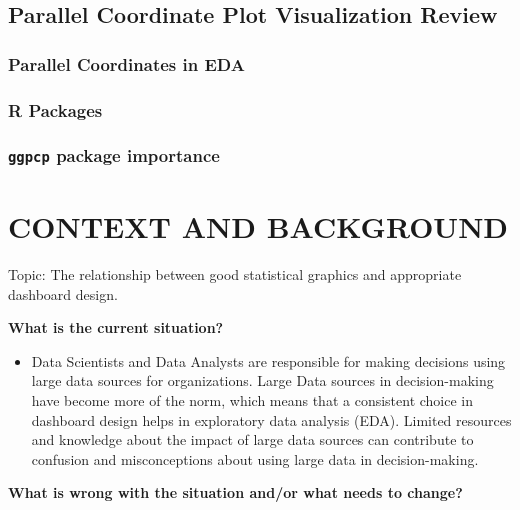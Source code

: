 \documentclass[print]{nuthesis}
\providecommand{\tightlist}{%
  \setlength{\itemsep}{0pt}\setlength{\parskip}{0pt}}
\begin{document}
\hypertarget{parallel-coordinate-plot-visualization-review}{%
\section{Parallel Coordinate Plot Visualization Review}\label{parallel-coordinate-plot-visualization-review}}

\hypertarget{parallel-coordinates-in-eda}{%
\subsection{Parallel Coordinates in EDA}\label{parallel-coordinates-in-eda}}

\hypertarget{r-packages}{%
\subsection{R Packages}\label{r-packages}}

\hypertarget{ggpcp-package-importance}{%
\subsection{\texorpdfstring{\texttt{ggpcp} package importance}{ggpcp package importance}}\label{ggpcp-package-importance}}

\hypertarget{context-and-background}{%
\chapter{CONTEXT AND BACKGROUND}\label{context-and-background}}

Topic: The relationship between good statistical graphics and appropriate dashboard design.

\textbf{What is the current situation?}

\begin{itemize}
\tightlist
\item
  Data Scientists and Data Analysts are responsible for making decisions using large data sources for organizations. Large Data sources in decision-making have become more of the norm, which means that a consistent choice in dashboard design helps in exploratory data analysis (EDA). Limited resources and knowledge about the impact of large data sources can contribute to confusion and misconceptions about using large data in decision-making.
\end{itemize}

\textbf{What is wrong with the situation and/or what needs to change?}
\end{document}
